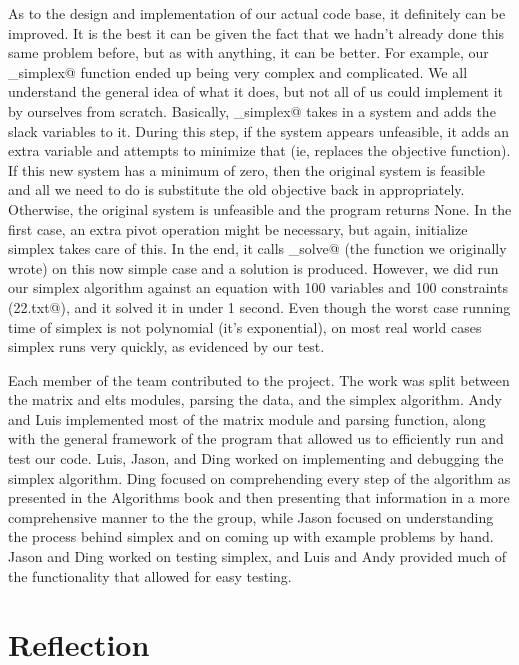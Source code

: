 \documentclass[letterpaper,11pt]{article}
\begin{document}
As to the design and implementation of our actual code base, it definitely can
be improved. It is the best it can be given the fact that we hadn't already done
this same problem before, but as with anything, it can be better. For example,
our \verb@initialize_simplex@ function ended up being very complex and
complicated. We all understand the general idea of what it does, but not all of
us could implement it by ourselves from scratch. Basically,
\verb@initialize_simplex@ takes in a system and adds the slack variables to it.
During this step, if the system appears unfeasible, it adds an extra variable
and attempts to minimize that (ie, replaces the objective function). If this new
system has a minimum of zero, then the original system is feasible and all we
need to do is substitute the old objective back in appropriately. Otherwise, the
original system is unfeasible and the program returns None. In the first case,
an extra pivot operation might be necessary, but again, initialize simplex takes
care of this.  In the end, it calls \verb@simple_solve@ (the function we
originally wrote) on this now simple case and a solution is produced. However,
we did run our simplex algorithm against an equation with 100 variables and 100
constraints (\verb@test22.txt@), and it solved it in under 1 second. Even though
the worst case running time of simplex is not polynomial (it's exponential), on
most real world cases simplex runs very quickly, as evidenced by our test. 

Each member of the team contributed to the project. The work was split between
the matrix and elts modules, parsing the data, and the simplex algorithm. Andy
and Luis implemented most of the matrix module and parsing function, along with
the general framework of the program that allowed us to efficiently run and test
our code. Luis, Jason, and Ding worked on implementing and debugging the simplex
algorithm. Ding focused on comprehending every step of the algorithm as
presented in the Algorithms book and then presenting that information in a more
comprehensive manner to the the group, while Jason focused on understanding the
process behind simplex and on coming up with example problems by hand. Jason and
Ding worked on testing simplex, and Luis and Andy provided much of the
functionality that allowed for easy testing. 

\section{Reflection}
\end{document}
